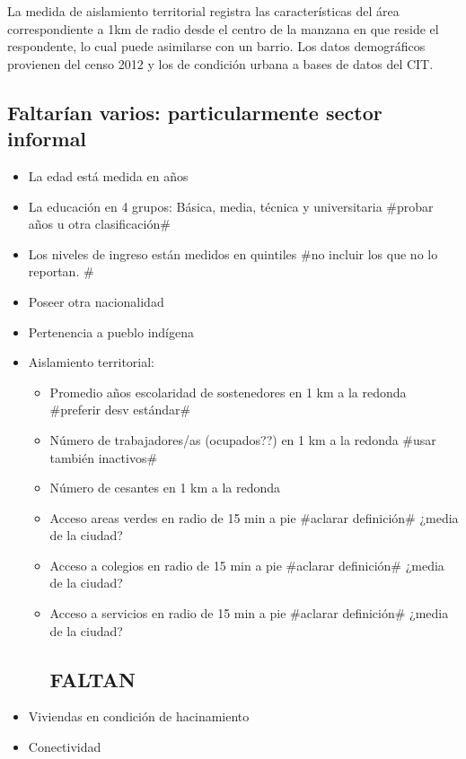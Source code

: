 \documentclass[
  12pt,
]{book}
\providecommand{\tightlist}{%
  \setlength{\itemsep}{0pt}\setlength{\parskip}{0pt}}
\begin{document}
La medida de aislamiento territorial registra las características del área correspondiente a 1km de radio desde el centro de la manzana en que reside el respondente, lo cual puede asimilarse con un barrio. Los datos demográficos provienen del censo 2012 y los de condición urbana a bases de datos del CIT.

\hypertarget{faltaruxedan-varios-particularmente-sector-informal}{%
\subsection{Faltarían varios: particularmente sector informal}\label{faltaruxedan-varios-particularmente-sector-informal}}

\begin{itemize}
\tightlist
\item
  La edad está medida en años
\item
  La educación en 4 grupos: Básica, media, técnica y universitaria \#probar años u otra clasificación\#
\item
  Los niveles de ingreso están medidos en quintiles \#no incluir los que no lo reportan. \#
\item
  Poseer otra nacionalidad
\item
  Pertenencia a pueblo indígena
\item
  Aislamiento territorial:

  \begin{itemize}
  \item
    Promedio años escolaridad de sostenedores en 1 km a la redonda \#preferir desv estándar\#
  \item
    Número de trabajadores/as (ocupados??) en 1 km a la redonda \#usar también inactivos\#
  \item
    Número de cesantes en 1 km a la redonda
  \item
    Acceso areas verdes en radio de 15 min a pie \#aclarar definición\# ¿media de la ciudad?
  \item
    Acceso a colegios en radio de 15 min a pie \#aclarar definición\# ¿media de la ciudad?
  \item
    Acceso a servicios en radio de 15 min a pie \#aclarar definición\# ¿media de la ciudad?

    \hypertarget{faltan}{%
    \subsection{FALTAN}\label{faltan}}
  \end{itemize}
\item
  Viviendas en condición de hacinamiento
\item
  Conectividad
\end{itemize}
\end{document}
